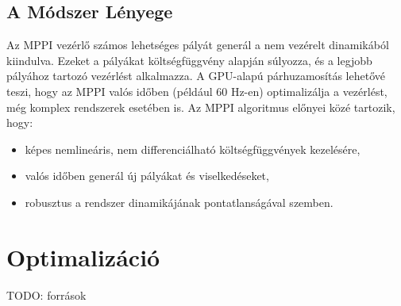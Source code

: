 \subsection{A Módszer Lényege}
Az MPPI vezérlő számos lehetséges pályát generál a nem vezérelt dinamikából kiindulva. Ezeket a pályákat költségfüggvény alapján súlyozza, és a legjobb pályához tartozó vezérlést alkalmazza. A GPU-alapú párhuzamosítás lehetővé teszi, hogy az MPPI valós időben (például 60 Hz-en) optimalizálja a vezérlést, még komplex rendszerek esetében is. Az MPPI algoritmus előnyei közé tartozik, hogy:
\begin{itemize}
    \item képes nemlineáris, nem differenciálható költségfüggvények kezelésére,
    \item valós időben generál új pályákat és viselkedéseket,
    \item robusztus a rendszer dinamikájának pontatlanságával szemben.
\end{itemize}

\section{Optimalizáció}
TODO: források






